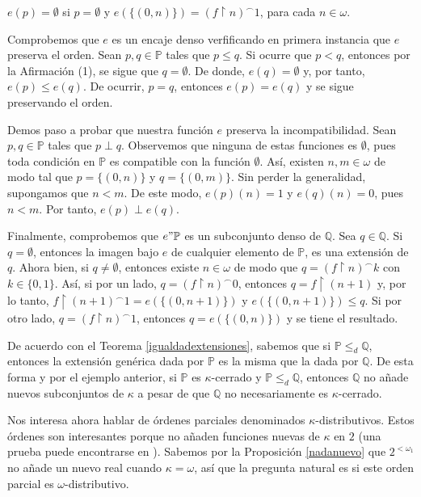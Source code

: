 \documentclass[11pt]{unam_tesis1}
\theoremstyle{MyThmStyle}
\theoremstyle{definition}
\theoremstyle{plain}
\theoremstyle{remark}
\def\rest{\mathop{\upharpoonright}\nolimits}
\let\leq\leqslant
\begin{document}
\begin{center}
$e(p)=\emptyset$ si $p=\emptyset$ y $e(\{(0,n)\})=(f\rest n)^\frown 1$, para cada $n\in \omega$.
\end{center} 

Comprobemos que $e$ es un encaje denso verfificando en primera instancia que $e$ preserva el orden. Sean $p,q\in \mathbb P$ tales que $p\leq q$. Si ocurre que $p< q$, entonces por la Afirmaci\'on (1), se sigue que $q=\emptyset$. De donde, $e(q)=\emptyset$ y, por tanto, $e(p)\leq e(q)$. De ocurrir, $p=q$, entonces $e(p)=e(q)$ y se sigue preservando el orden.

Demos paso a probar que nuestra funci\'on $e$ preserva la incompatibilidad. Sean $p,q\in \mathbb P$ tales que $p\perp q$. Observemos que ninguna de estas funciones es $\emptyset$, pues toda condici\'on en $\mathbb P$ es compatible con la funci\'on $\emptyset$. As\'i, existen $n,m\in \omega$ de modo tal que $p=\{(0,n)\}$ y $q=\{(0,m)\}$. Sin perder la generalidad, supongamos que $n<m$. De este modo, $e(p)(n)=1$ y $e(q)(n)=0$, pues $n<m$. Por tanto, $e(p)\perp e(q)$.

Finalmente, comprobemos que $e"\mathbb P$ es un subconjunto denso de $\mathbb Q$. Sea $q\in \mathbb Q$. Si $q=\emptyset$, entonces la imagen bajo $e$ de cualquier elemento de $\mathbb P$, es una extensi\'on de $q$. Ahora bien, si $q\neq \emptyset$, entonces existe $n\in \omega$ de modo que $q=(f\rest n)^\frown k$ con $k\in \{0,1\}$. As\'i, si por un lado, $q=(f\rest n)^\frown 0$, entonces $q=f\rest (n+1)$ y, por lo tanto, $f\rest (n+1)^\frown 1=e(\{(0,n+1)\})$ y $e(\{(0,n+1)\})\leq q$. Si por otro lado, $q=(f\rest n)^\frown 1$, entonces $q=e(\{(0,n)\})$ y se tiene el resultado.

De acuerdo con el Teorema \ref{igualdadextensiones}, sabemos que si $\mathbb P\leq_d \mathbb Q$, entonces la extensi\'on gen\'erica dada por $\mathbb P$ es la misma que la dada por $\mathbb Q$. De esta forma y por el ejemplo anterior, si $\mathbb P$ es $\kappa$-cerrado y $\mathbb P\leq_d\mathbb Q$, entonces $\mathbb Q$ no a\~nade nuevos subconjuntos de $\kappa$ a pesar de que $\mathbb Q$ no necesariamente es $\kappa$-cerrado.

Nos interesa ahora hablar de \'ordenes parciales denominados $\kappa$-distributivos. Estos \'ordenes son interesantes porque no a\~naden funciones nuevas de $\kappa$ en $2$ (una prueba puede encontrarse en \cite [Theorem 15.6, p. 228]{jech}). Sabemos por la Proposici\'on \ref{nadanuevo} que $2^{<\omega_1}$ no a\~nade un nuevo real cuando $\kappa = \omega$, as\'i que la pregunta natural es si este orden parcial es $\omega$-distributivo.
\end{document}
